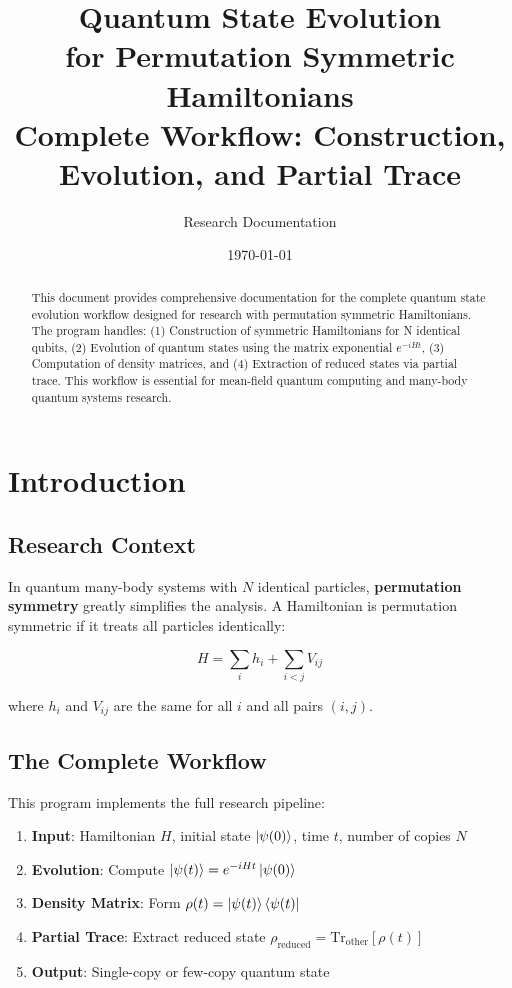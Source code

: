 \documentclass[11pt,a4paper]{article}
\title{\textbf{Quantum State Evolution}\\
\textbf{for Permutation Symmetric Hamiltonians}\\[1em]
\large Complete Workflow: Construction, Evolution, and Partial Trace}
\author{Research Documentation}
\date{\today}
\begin{document}
\maketitle

\begin{abstract}
This document provides comprehensive documentation for the complete quantum state evolution workflow designed for research with permutation symmetric Hamiltonians. The program handles: (1) Construction of symmetric Hamiltonians for N identical qubits, (2) Evolution of quantum states using the matrix exponential $e^{-iHt}$, (3) Computation of density matrices, and (4) Extraction of reduced states via partial trace. This workflow is essential for mean-field quantum computing and many-body quantum systems research.
\end{abstract}

\tableofcontents
\newpage

\section{Introduction}

\subsection{Research Context}

In quantum many-body systems with $N$ identical particles, \textbf{permutation symmetry} greatly simplifies the analysis. A Hamiltonian is permutation symmetric if it treats all particles identically:

\begin{equation}
    H = \sum_i h_i + \sum_{i<j} V_{ij}
\end{equation}

where $h_i$ and $V_{ij}$ are the same for all $i$ and all pairs $(i,j)$.

\subsection{The Complete Workflow}

This program implements the full research pipeline:

\begin{enumerate}
    \item \textbf{Input}: Hamiltonian $H$, initial state $\ket{\psi(0)}$, time $t$, number of copies $N$
    \item \textbf{Evolution}: Compute $\ket{\psi(t)} = e^{-iHt}\ket{\psi(0)}$
    \item \textbf{Density Matrix}: Form $\rho(t) = \ket{\psi(t)}\bra{\psi(t)}$
    \item \textbf{Partial Trace}: Extract reduced state $\rho_{\text{reduced}} = \text{Tr}_{\text{other}}[\rho(t)]$
    \item \textbf{Output}: Single-copy or few-copy quantum state
\end{enumerate}
\end{document}
